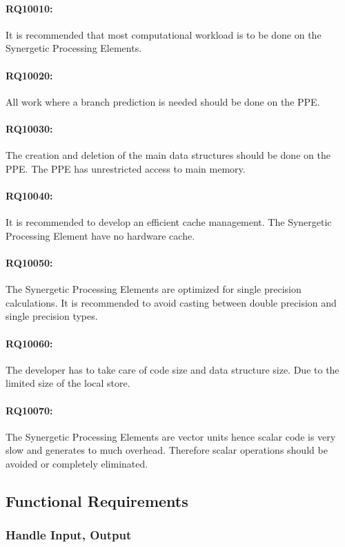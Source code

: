 \documentclass[DIV10, abstracton, openright, footsepline, headsepline, twoside, 9pt,
bigheadings]{scrreprt}
\begin{document}
\paragraph{RQ10010:} It is recommended that most computational workload is to be done
on the Synergetic Processing Elements.
\paragraph{RQ10020:} All work where a branch prediction is needed should be done on
the PPE.
\paragraph{RQ10030:} The creation and deletion of the main data structures should be
done on
the PPE. The PPE has unrestricted access to main memory.
\paragraph{RQ10040:} It is
recommended to develop an efficient cache management. The Synergetic Processing
Element have no hardware cache.
\paragraph{RQ10050:} The Synergetic Processing Elements are
optimized for single precision calculations. It is recommended to avoid
casting
between double precision and single precision types.
\paragraph{RQ10060:} The developer has to take care of code size and data structure size. Due to the limited size of the local store.
\paragraph{RQ10070:} The Synergetic Processing Elements are vector units hence
sca\-lar code is very slow and generates to much overhead. Therefore scalar
operations should be avoided or completely eliminated.

\subsection{Functional Requirements}

\subsubsection{Handle Input, Output}
\end{document}
